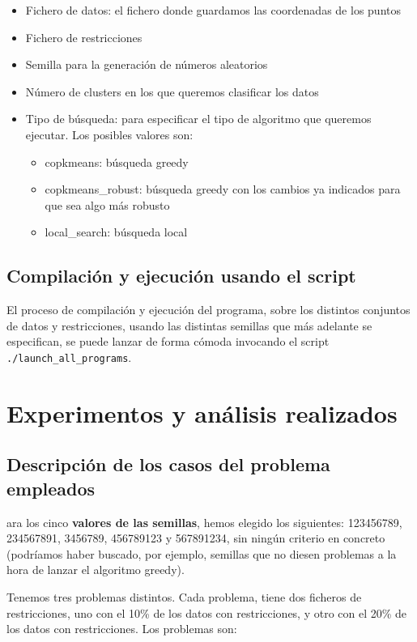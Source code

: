 \documentclass[11pt]{article}
\begin{document}
\begin{itemize}
    \item Fichero de datos: el fichero donde guardamos las coordenadas de los puntos
    \item Fichero de restricciones
    \item Semilla para la generación de números aleatorios
    \item Número de clusters en los que queremos clasificar los datos
    \item Tipo de búsqueda: para especificar el tipo de algoritmo que queremos ejecutar. Los posibles valores son:
    \begin{itemize}
        \item copkmeans: búsqueda greedy
        \item copkmeans\_robust: búsqueda greedy con los cambios ya indicados para que sea algo más robusto
        \item local\_search: búsqueda local
    \end{itemize}
\end{itemize}

\subsection{Compilación y ejecución usando el script}

El proceso de compilación y ejecución del programa, sobre los distintos conjuntos de datos y restricciones, usando las distintas semillas que más adelante se especifican, se puede lanzar de forma cómoda invocando el script \lstinline{./launch_all_programs}.

\pagebreak

\section{Experimentos y análisis realizados}

\subsection{Descripción de los casos del problema empleados}

ara los cinco \textbf{valores de las semillas}, hemos elegido los siguientes: 123456789, 234567891, 3456789, 456789123 y 567891234, sin ningún criterio en concreto (podríamos haber buscado, por ejemplo, semillas que no diesen problemas a la hora de lanzar el algoritmo greedy).

Tenemos tres problemas distintos. Cada problema, tiene dos ficheros de restricciones, uno con el 10\% de los datos con restricciones, y otro con el 20\% de los datos con restricciones. Los problemas son:
\end{document}
